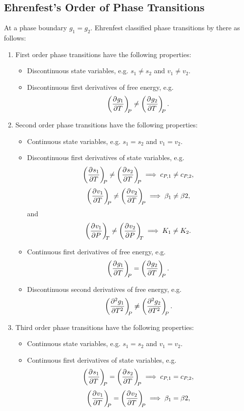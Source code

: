     \subsection{Ehrenfest's Order of Phase Transitions}
    At a phase boundary \(g_1 = g_2\).
    Ehrenfest classified phase transitions by there  as follows:
    \begin{enumerate}
        \item First order phase transitions have the following properties:
        \begin{itemize}
            \item Discontinuous state variables, e.g. \(s_1 \ne s_2\) and \(v_1 \ne v_2\).
            \item Discontinuous first derivatives of free energy, e.g.
            \[\left(\pdv[]{g_1}{T}\right)_{\!\!{P}} \ne \left(\pdv[]{g_2}{T}\right)_{\!\!{P}}.\]
        \end{itemize}
        \item Second order phase transitions have the following properties:
        \begin{itemize}
            \item Continuous state variables, e.g. \(s_1 = s_2\) and \(v_1 = v_2\).
            \item Discontinuous first derivatives of state variables, e.g.
            \[\left(\pdv[]{s_1}{T}\right)_{\!\!{P}} \ne \left(\pdv[]{s_2}{T}\right)_{\!\!{P}} \implies c_{P,1} \ne c_{P,2},\]
            \[\left(\pdv[]{v_1}{T}\right)_{\!\!{P}} \ne \left(\pdv[]{v_2}{T}\right)_{\!\!{P}} \implies \beta_1 \ne \beta 2,\]
            and
            \[\left(\pdv[]{v_1}{P}\right)_{\!\!{T}} \ne \left(\pdv[]{v_2}{P}\right)_{\!\!{T}} \implies K_1 \ne K_2.\]
            \item Continuous first derivatives of free energy, e.g.
            \[\left(\pdv[]{g_1}{T}\right)_{\!\!{P}} = \left(\pdv[]{g_2}{T}\right)_{\!\!{P}}.\]
            \item Discontinuous second derivatives of free energy, e.g.
            \[\left(\pdv[2]{g_1}{T}\right)_{\!\!{P}} \ne \left(\pdv[2]{g_2}{T}\right)_{\!\!{P}}.\]
        \end{itemize}
        \item Third order phase transitions have the following properties:
        \begin{itemize}
            \item Continuous state variables, e.g. \(s_1 = s_2\) and \(v_1 = v_2\).
            \item Continuous first derivatives of state variables, e.g.
            \[\left(\pdv[]{s_1}{T}\right)_{\!\!{P}} = \left(\pdv[]{s_2}{T}\right)_{\!\!{P}} \implies c_{P,1} = c_{P,2},\]
            \[\left(\pdv[]{v_1}{T}\right)_{\!\!{P}} = \left(\pdv[]{v_2}{T}\right)_{\!\!{P}} \implies \beta_1 = \beta 2,\]

\end{itemize}
\end{enumerate}
